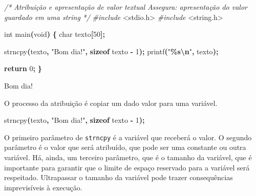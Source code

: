 \documentclass[
  11pt,
  a4paper,
]{scrbook}
\newenvironment{Shaded}{\begin{snugshade}}{\end{snugshade}}
\newcommand{\CommentTok}[1]{\textcolor[rgb]{0.56,0.35,0.01}{\textit{#1}}}
\newcommand{\ControlFlowTok}[1]{\textcolor[rgb]{0.13,0.29,0.53}{\textbf{#1}}}
\newcommand{\DataTypeTok}[1]{\textcolor[rgb]{0.13,0.29,0.53}{#1}}
\newcommand{\DecValTok}[1]{\textcolor[rgb]{0.00,0.00,0.81}{#1}}
\newcommand{\ImportTok}[1]{#1}
\newcommand{\KeywordTok}[1]{\textcolor[rgb]{0.13,0.29,0.53}{\textbf{#1}}}
\newcommand{\NormalTok}[1]{#1}
\newcommand{\OperatorTok}[1]{\textcolor[rgb]{0.81,0.36,0.00}{\textbf{#1}}}
\newcommand{\PreprocessorTok}[1]{\textcolor[rgb]{0.56,0.35,0.01}{\textit{#1}}}
\newcommand{\SpecialCharTok}[1]{\textcolor[rgb]{0.81,0.36,0.00}{\textbf{#1}}}
\newcommand{\StringTok}[1]{\textcolor[rgb]{0.31,0.60,0.02}{#1}}
\begin{document}
\begin{Shaded}
\begin{Highlighting}[]
\CommentTok{/*}
\CommentTok{Atribuição e apresentação de valor textual}
\CommentTok{Assegura: apresentação do valor guardado em uma string}
\CommentTok{*/}
\PreprocessorTok{\#include }\ImportTok{\textless{}stdio.h\textgreater{}}
\PreprocessorTok{\#include }\ImportTok{\textless{}string.h\textgreater{}}

\DataTypeTok{int}\NormalTok{ main}\OperatorTok{(}\DataTypeTok{void}\OperatorTok{)} \OperatorTok{\{}
    \DataTypeTok{char}\NormalTok{ texto}\OperatorTok{[}\DecValTok{50}\OperatorTok{];}

\NormalTok{    strncpy}\OperatorTok{(}\NormalTok{texto}\OperatorTok{,} \StringTok{"Bom dia!"}\OperatorTok{,} \KeywordTok{sizeof}\NormalTok{ texto }\OperatorTok{{-}} \DecValTok{1}\OperatorTok{);}
\NormalTok{    printf}\OperatorTok{(}\StringTok{"}\SpecialCharTok{\%s\textbackslash{}n}\StringTok{"}\OperatorTok{,}\NormalTok{ texto}\OperatorTok{);}

    \ControlFlowTok{return} \DecValTok{0}\OperatorTok{;}
\OperatorTok{\}}
\end{Highlighting}
\end{Shaded}

\begin{Shaded}
\begin{Highlighting}[]
\NormalTok{Bom dia!}
\end{Highlighting}
\end{Shaded}

O processo da atribuição é copiar um dado valor para uma variável.

\begin{Shaded}
\begin{Highlighting}[]
\NormalTok{strncpy}\OperatorTok{(}\NormalTok{texto}\OperatorTok{,} \StringTok{"Bom dia!"}\OperatorTok{,} \KeywordTok{sizeof}\NormalTok{ texto }\OperatorTok{{-}} \DecValTok{1}\OperatorTok{);}
\end{Highlighting}
\end{Shaded}

O primeiro parâmetro de \texttt{strncpy} é a variável que receberá o
valor. O segundo parâmetro é o valor que será atribuído, que pode ser
uma constante ou outra variável. Há, ainda, um terceiro parâmetro, que é
o tamanho da variável, que é importante para garantir que o limite de
espaço reservado para a variável será respeitado. Ultrapassar o tamanho
da variável pode trazer consequências imprevisíveis à execução.
\end{document}
